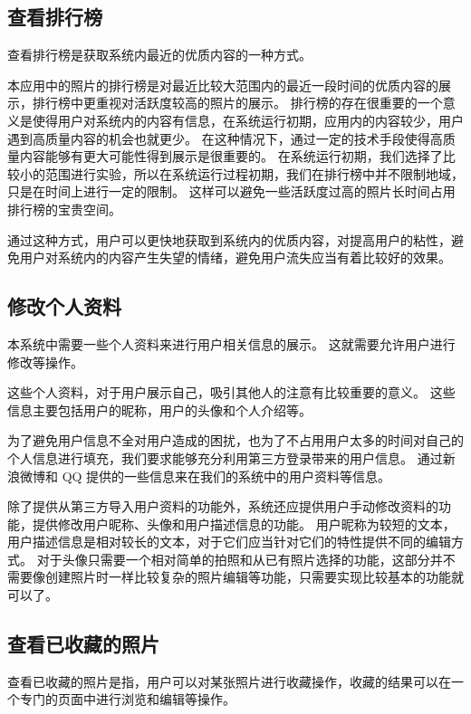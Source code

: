 \subsection{查看排行榜}

查看排行榜是获取系统内最近的优质内容的一种方式。

本应用中的照片的排行榜是对最近比较大范围内的最近一段时间的优质内容的展示，排行榜中更重视对活跃度较高的照片的展示。
排行榜的存在很重要的一个意义是使得用户对系统内的内容有信息，在系统运行初期，应用内的内容较少，用户遇到高质量内容的机会也就更少。
在这种情况下，通过一定的技术手段使得高质量内容能够有更大可能性得到展示是很重要的。
在系统运行初期，我们选择了比较小的范围进行实验，所以在系统运行过程初期，我们在排行榜中并不限制地域，只是在时间上进行一定的限制。
这样可以避免一些活跃度过高的照片长时间占用排行榜的宝贵空间。

通过这种方式，用户可以更快地获取到系统内的优质内容，对提高用户的粘性，避免用户对系统内的内容产生失望的情绪，避免用户流失应当有着比较好的效果。

\subsection{修改个人资料}

本系统中需要一些个人资料来进行用户相关信息的展示。
这就需要允许用户进行修改等操作。

这些个人资料，对于用户展示自己，吸引其他人的注意有比较重要的意义。
这些信息主要包括用户的昵称，用户的头像和个人介绍等。

为了避免用户信息不全对用户造成的困扰，也为了不占用用户太多的时间对自己的个人信息进行填充，我们要求能够充分利用第三方登录带来的用户信息。
通过新浪微博和 QQ 提供的一些信息来在我们的系统中的用户资料等信息。

除了提供从第三方导入用户资料的功能外，系统还应提供用户手动修改资料的功能，提供修改用户昵称、头像和用户描述信息的功能。
用户昵称为较短的文本，用户描述信息是相对较长的文本，对于它们应当针对它们的特性提供不同的编辑方式。
对于头像只需要一个相对简单的拍照和从已有照片选择的功能，这部分并不需要像创建照片时一样比较复杂的照片编辑等功能，只需要实现比较基本的功能就可以了。

\subsection{查看已收藏的照片}

查看已收藏的照片是指，用户可以对某张照片进行收藏操作，收藏的结果可以在一个专门的页面中进行浏览和编辑等操作。

